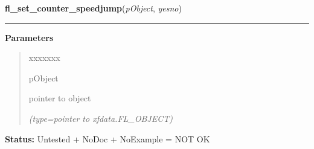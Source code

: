 \hspace{.8\funcindent}\begin{boxedminipage}{\funcwidth}

    \raggedright \textbf{fl\_set\_counter\_speedjump}(\textit{pObject}, \textit{yesno})

    \vspace{-1.5ex}

    \rule{\textwidth}{0.5\fboxrule}
\setlength{\parskip}{2ex}
\setlength{\parskip}{1ex}
      \textbf{Parameters}
      \vspace{-1ex}

      \begin{quote}
        \begin{Ventry}{xxxxxxx}

          \item[pObject]

          pointer to object

            {\it (type=pointer to xfdata.FL\_OBJECT)}

        \end{Ventry}

      \end{quote}

\textbf{Status:} Untested + NoDoc + NoExample = NOT OK



    \end{boxedminipage}

    \label{xformslib:library:fl_set_cursor}

    \vspace{0.5ex}

